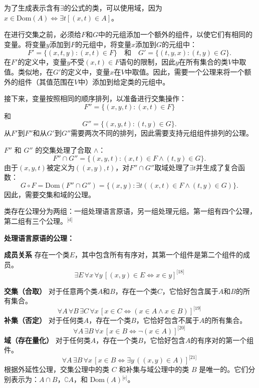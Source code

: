 为了生成表示含有\( \exists \)的公式的类，可以使用域，因为\( x \in \text{Dom}(A) \iff \exists t \left[ (x,t) \in A \right] \)。

在进行交集之前，必须给\( F \)和\( G \)中的元组添加一个额外的组件，以使它们有相同的变量。将变量\( y \)添加到\( F \)的元组中，将变量\( x \)添加到\( G \)的元组中：
\[
F' = \{ (x,t,y) : (x,t) \in F \} \quad \text{和} \quad G' = \{ (t,y,x) : (t,y) \in G \}.~
\]
在\( F' \)的定义中，变量\( y \)不受\( (x,t) \in F \)语句的限制，因此\( y \)在所有集合的类\( V \)中取值。类似地，在\( G' \)的定义中，变量\( x \)在\( V \)中取值。因此，需要一个公理来将一个额外的组件（其值范围在\( V \)中）添加到给定类的元组中。

接下来，变量按照相同的顺序排列，以准备进行交集操作：
\[
F'' = \{ (x, y, t) : (x, t) \in F \}~
\]
和
\[
G'' = \{ (x, y, t) : (t, y) \in G \}.~
\]
从\( F' \)到\( F'' \)和从\( G' \)到\( G'' \)需要两次不同的排列，因此需要支持元组组件排列的公理。

\( F'' \) 和 \( G'' \) 的交集处理了合取 \( \land \)：
\[
F'' \cap G'' = \{ (x, y, t) : (x, t) \in F \land (t, y) \in G \}.~
\]
由于\( (x, y, t) \)被定义为\( ((x, y), t) \)，对\( F'' \cap G'' \)取域处理了\( \exists t \)并生成了复合函数：
\[
G \circ F = \text{Dom}(F'' \cap G'') = \{ (x, y) : \exists t ((x, t) \in F \land (t, y) \in G) \}.~
\]
因此，需要交集和域的公理。

类存在公理分为两组：一组处理语言原语，另一组处理元组。第一组有四个公理，第二组有三个公理。\(^\text{[d]}\)

\textbf{处理语言原语的公理：}

\textbf{成员关系} 
存在一个类\( E \)，其中包含所有有序对，其第一个组件是第二个组件的成员。
\[
\exists E \, \forall x \, \forall y \, \left[ (x, y) \in E \iff x \in y \right]^\text{[18]}~
\]

\textbf{交集（合取）} 
对于任意两个类\( A \)和\( B \)，存在一个类\( C \)，它恰好包含属于\( A \)和\( B \)的所有集合。
\[
\forall A \, \forall B \, \exists C \, \forall x \, \left[ x \in C \iff (x \in A \land x \in B) \right]^\text{[19]}~
\]
\textbf{补集（否定）}  
对于任何类\( A \)，存在一个类\( B \)，它恰好包含不属于\( A \)的所有集合。
\[
\forall A \, \exists B \, \forall x \, \left[ x \in B \iff \neg (x \in A) \right]^\text{[20]}~
\]
\textbf{域（存在量化）} 
对于任何类\( A \)，存在一个类\( B \)，它恰好包含\( A \)的有序对的第一个组件。
\[
\forall A \, \exists B \, \forall x \, \left[ x \in B \iff \exists y \, ((x, y) \in A) \right]^\text{[21]}~
\]
根据外延性公理，交集公理中的类 \( C \) 和补集与域公理中的类 \( B \) 是唯一的。它们分别表示为：\( A \cap B \)，\( \complement A \)，和 \( \text{Dom}(A) \)\(^\text{[e]}\)。

